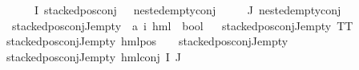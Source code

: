 \begin{isabellebody}
\ {\isachardoublequoteopen}{\isasymforall}{\isasymphi}\ {\isasymin}\ {\isacharparenleft}{\kern0pt}{\isasymPhi}\ {\isacharbackquote}{\kern0pt}\ I{\isacharparenright}{\kern0pt}{\isachardot}{\kern0pt}\ {\isacharparenleft}{\kern0pt}{\isacharparenleft}{\kern0pt}stacked{\isacharunderscore}{\kern0pt}pos{\isacharunderscore}{\kern0pt}conj\ {\isasymphi}{\isacharparenright}{\kern0pt}\ {\isasymor}\ nested{\isacharunderscore}{\kern0pt}empty{\isacharunderscore}{\kern0pt}conj\ {\isasymphi}{\isacharparenright}{\kern0pt}{\isachardoublequoteclose}\isanewline
{\isachardoublequoteopen}{\isacharparenleft}{\kern0pt}{\isasymforall}{\isasympsi}\ {\isasymin}\ {\isacharparenleft}{\kern0pt}{\isasymPhi}\ {\isacharbackquote}{\kern0pt}\ J{\isacharparenright}{\kern0pt}{\isachardot}{\kern0pt}\ nested{\isacharunderscore}{\kern0pt}empty{\isacharunderscore}{\kern0pt}conj\ {\isasympsi}{\isacharparenright}{\kern0pt}{\isachardoublequoteclose}\isanewline
\isanewline
{}\isamarkupfalse%
\ stacked{\isacharunderscore}{\kern0pt}pos{\isacharunderscore}{\kern0pt}conj{\isacharunderscore}{\kern0pt}J{\isacharunderscore}{\kern0pt}empty\ {\isacharcolon}{\kern0pt}{\isacharcolon}{\kern0pt}\ {\isachardoublequoteopen}{\isacharparenleft}{\kern0pt}{\isacharprime}{\kern0pt}a{\isacharcomma}{\kern0pt}\ {\isacharprime}{\kern0pt}i{\isacharparenright}{\kern0pt}\ hml\ {\isasymRightarrow}\ bool{\isachardoublequoteclose}\isanewline
\ \ \isanewline
{\isachardoublequoteopen}stacked{\isacharunderscore}{\kern0pt}pos{\isacharunderscore}{\kern0pt}conj{\isacharunderscore}{\kern0pt}J{\isacharunderscore}{\kern0pt}empty\ TT{\isachardoublequoteclose}\ {\isacharbar}{\kern0pt}\isanewline
{\isachardoublequoteopen}stacked{\isacharunderscore}{\kern0pt}pos{\isacharunderscore}{\kern0pt}conj{\isacharunderscore}{\kern0pt}J{\isacharunderscore}{\kern0pt}empty\ {\isacharparenleft}{\kern0pt}hml{\isacharunderscore}{\kern0pt}pos\ {\isacharunderscore}{\kern0pt}\ {\isasympsi}{\isacharparenright}{\kern0pt}{\isachardoublequoteclose}\ \ {\isachardoublequoteopen}stacked{\isacharunderscore}{\kern0pt}pos{\isacharunderscore}{\kern0pt}conj{\isacharunderscore}{\kern0pt}J{\isacharunderscore}{\kern0pt}empty\ {\isasympsi}{\isachardoublequoteclose}\ {\isacharbar}{\kern0pt}\isanewline
{\isachardoublequoteopen}stacked{\isacharunderscore}{\kern0pt}pos{\isacharunderscore}{\kern0pt}conj{\isacharunderscore}{\kern0pt}J{\isacharunderscore}{\kern0pt}empty\ {\isacharparenleft}{\kern0pt}hml{\isacharunderscore}{\kern0pt}conj\ I\ J\ {\isasymPhi}{\isacharparenright}{\kern0pt}{\isachardoublequoteclose}\isanewline

\end{isabellebody}
